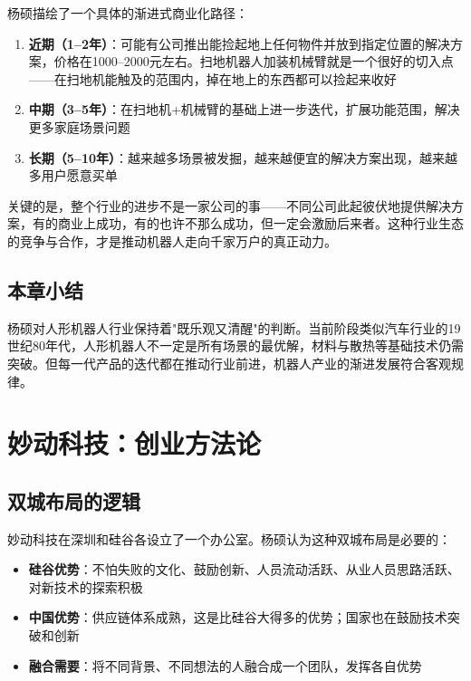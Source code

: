 \documentclass[a4paper]{article}
\begin{document}
杨硕描绘了一个具体的渐进式商业化路径：

\begin{enumerate}
    \item \textbf{近期（1--2年）}：可能有公司推出能捡起地上任何物件并放到指定位置的解决方案，价格在1000--2000元左右。扫地机器人加装机械臂就是一个很好的切入点——在扫地机能触及的范围内，掉在地上的东西都可以捡起来收好
    \item \textbf{中期（3--5年）}：在扫地机+机械臂的基础上进一步迭代，扩展功能范围，解决更多家庭场景问题
    \item \textbf{长期（5--10年）}：越来越多场景被发掘，越来越便宜的解决方案出现，越来越多用户愿意买单
\end{enumerate}

关键的是，整个行业的进步不是一家公司的事——不同公司此起彼伏地提供解决方案，有的商业上成功，有的也许不那么成功，但一定会激励后来者。这种行业生态的竞争与合作，才是推动机器人走向千家万户的真正动力。

\subsection{本章小结}

杨硕对人形机器人行业保持着"既乐观又清醒"的判断。当前阶段类似汽车行业的19世纪80年代，人形机器人不一定是所有场景的最优解，材料与散热等基础技术仍需突破。但每一代产品的迭代都在推动行业前进，机器人产业的渐进发展符合客观规律。


\section{妙动科技：创业方法论}

\subsection{双城布局的逻辑}

妙动科技在深圳和硅谷各设立了一个办公室。杨硕认为这种双城布局是必要的：

\begin{itemize}
    \item \textbf{硅谷优势}：不怕失败的文化、鼓励创新、人员流动活跃、从业人员思路活跃、对新技术的探索积极
    \item \textbf{中国优势}：供应链体系成熟，这是比硅谷大得多的优势；国家也在鼓励技术突破和创新
    \item \textbf{融合需要}：将不同背景、不同想法的人融合成一个团队，发挥各自优势
\end{itemize}
\end{document}
